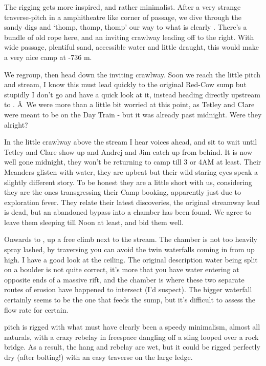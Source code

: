 The rigging gets more inspired, and rather minimalist. After a very
strange traverse-pitch in a amphitheatre like corner of passage, we dive
through the sandy digs and `thomp, thomp, thomp' our way to what is
clearly . There's a bundle of old rope here, and an
inviting crawlway leading off to the right. With wide passage, plentiful
sand, accessible water and little draught, this would make a very nice
camp at -736 m.

We regroup, then head down the inviting crawlway. Soon we reach the
little pitch and stream, I know this must lead quickly to the original
Red-Cow sump but stupidly I don't go and have a quick look at it,
instead heading directly upstream to . Â~We were more
than a little bit worried at this point, as Tetley and Clare were meant
to be on the Day Train - but it was already past midnight. Were they
alright?

In the little crawlway above the stream I hear voices ahead, and sit to
wait until Tetley and Clare show up and Andrej and Jim catch up from
behind. It is now well gone midnight, they won't be returning to camp
till 3 or 4AM at least. Their Meanders glisten with water, they are
upbeat but their wild staring eyes speak a slightly different story. To
be honest they are a little short with us, considering they are the ones
transgressing their Camp  booking, apparently just due to
exploration fever. They relate their latest discoveries, the original
streamway lead is dead, but an abandoned bypass into a chamber has been
found. We agree to leave them sleeping till Noon at least, and bid them
well.

Onwards to , up a free climb next to the stream. The
chamber is not too heavily spray lashed, by traversing you can avoid the
twin waterfalls coming in from up high. I have a good look at the
ceiling. The original description water being split on a boulder is not
quite correct, it's more that you have water entering at opposite ends
of a massive rift, and the  chamber is where these two
separate routes of erosion have happened to intersect (I'd suspect). The
bigger waterfall certainly seems to be the one that feeds the 
sump, but it's difficult to assess the flow rate for certain.

 pitch is rigged with what must have clearly been a
speedy minimalism, almost all naturals, with a crazy rebelay in
freespace dangling off a sling looped over a rock bridge. As a result,
the hang and rebelay are wet, but it could be rigged perfectly dry
(after bolting!) with an easy traverse on the large ledge.

